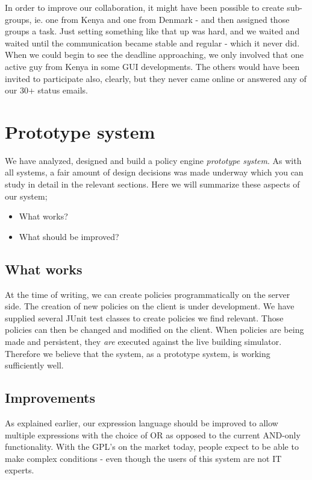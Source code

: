 In order to improve our collaboration, it might have been possible to create sub-groups, ie. one from Kenya and one from Denmark - and then assigned those groups a task. Just setting something like that up was hard, and we waited and waited until the communication became stable and regular - which it never did. When we could begin to see the deadline approaching, we only involved that one active guy from Kenya in some GUI developments. The others would have been invited to participate also, clearly, but they never came online or answered any of our 30+ status emails.

\section{Prototype system}\label{sec:product}
We have analyzed, designed and build a policy engine \textit{prototype system}. As with all systems, a fair amount of design decisions was made underway which you can study in detail in the relevant sections. Here we will summarize these aspects of our system;

\begin{itemize}
	\item What works?
	\item What should be improved?
\end{itemize}

\subsection{What works}
At the time of writing, we can create policies programmatically on the server side. The creation of new policies on the client is under development. We have supplied several JUnit test classes to create policies we find relevant. Those policies can then be changed and modified on the client. When policies are being made and persistent, they \textit{are} executed against the live building simulator. Therefore we believe that the system, as a prototype system, is working sufficiently well.

\subsection{Improvements}
As explained earlier, our expression language should be improved to allow multiple expressions with the choice of OR as opposed to the current AND-only functionality. With the GPL's on the market today, people expect to be able to make complex conditions - even though the users of this system are not IT experts. 

